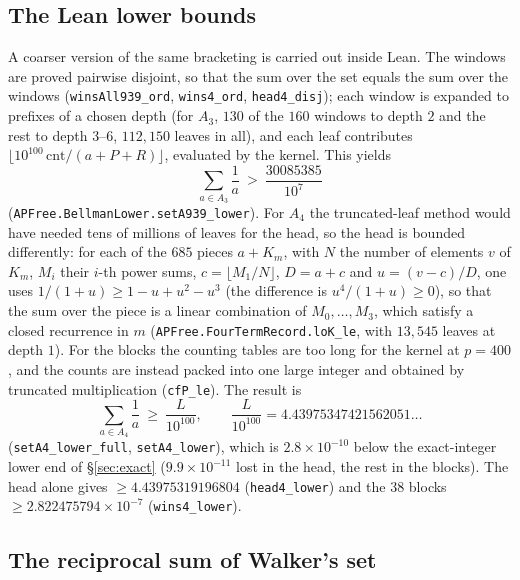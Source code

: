 \documentclass[11pt,a4paper]{article}
\theoremstyle{definition}
\theoremstyle{remark}
\newcommand{\code}[1]{\texttt{#1}}
\begin{document}
\subsection{The Lean lower bounds}\label{sec:leanbounds}

A coarser version of the same bracketing is carried out inside Lean. The windows are proved pairwise disjoint, so that the sum over the set equals the sum over the windows (\code{winsAll939\_\allowbreak{}ord}, \code{wins4\_\allowbreak{}ord}, \code{head4\_\allowbreak{}disj}); each window is expanded to prefixes of a chosen depth (for $A_3$, $130$ of the $160$ windows to depth $2$ and the rest to depth $3$--$6$, $112{,}150$ leaves in all), and each leaf contributes $\lfloor 10^{100}\,\mathrm{cnt}/(a+P+R) \rfloor$, evaluated by the kernel. This yields
\[
\sum_{a\in A_3}\frac1a\ >\ \frac{30085385}{10^{7}}
\]
(\code{APFree.\allowbreak{}BellmanLower.\allowbreak{}setA939\_\allowbreak{}lower}). For $A_4$ the truncated-leaf method would have needed tens of millions of leaves for the head, so the head is bounded differently: for each of the $685$ pieces $a + K_m$, with $N$ the number of elements $v$ of $K_m$, $M_i$ their $i$-th power sums, $c = \lfloor M_1/N \rfloor$, $D = a+c$ and $u = (v-c)/D$, one uses $1/(1+u) \ge 1 - u + u^2 - u^3$ (the difference is $u^4/(1+u) \ge 0$), so that the sum over the piece is a linear combination of $M_0, \dots, M_3$, which satisfy a closed recurrence in $m$ (\code{APFree.\allowbreak{}FourTermRecord.\allowbreak{}loK\_\allowbreak{}le}, with $13{,}545$ leaves at depth $1$). For the blocks the counting tables are too long for the kernel at $p = 400$, and the counts are instead packed into one large integer and obtained by truncated multiplication (\code{cfP\_\allowbreak{}le}). The result is
\[
\sum_{a\in A_4}\frac1a\ \ge\ \frac{L}{10^{100}},\qquad \frac{L}{10^{100}} = 4.43975347421562051\ldots
\]
(\code{setA4\_\allowbreak{}lower\_\allowbreak{}full}, \code{setA4\_\allowbreak{}lower}), which is $2.8 \times 10^{-10}$ below the exact-integer lower end of \S\ref{sec:exact} ($9.9 \times 10^{-11}$ lost in the head, the rest in the blocks). The head alone gives $\ge 4.43975319196804$ (\code{head4\_\allowbreak{}lower}) and the $38$ blocks $\ge 2.822475794 \times 10^{-7}$ (\code{wins4\_\allowbreak{}lower}).

\subsection{The reciprocal sum of Walker's set}\label{sec:walkerH}
\end{document}
